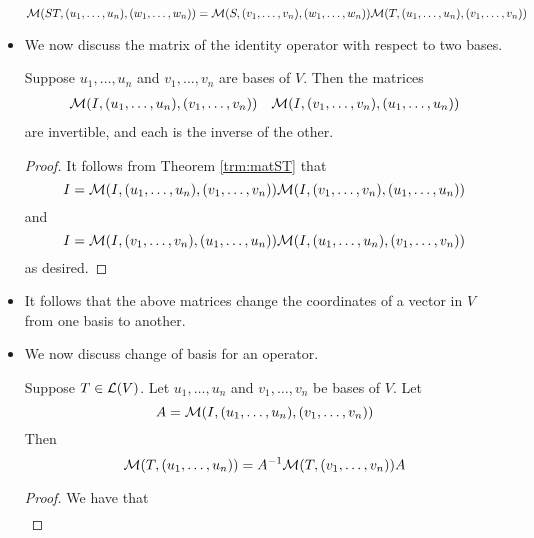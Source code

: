 \documentclass[../main.tex]{subfiles}
\begin{document}
\begin{itemize}
\begin{theorem}
        \begin{equation*}
            \mathcal{M}(ST,(u_1,\dots,u_n),(w_1,\dots,w_n)) = \mathcal{M}(S,(v_1,\dots,v_n),(w_1,\dots,w_n))\mathcal{M}(T,(u_1,\dots,u_n),(v_1,\dots,v_n))
        \end{equation*}
    \end{theorem}
    \item We now discuss the matrix of the identity operator with respect to two bases.
    \begin{theorem}\label{trm:changeBasisIdentity}
        Suppose $u_1,\dots,u_n$ and $v_1,\dots,v_n$ are bases of $V$. Then the matrices
        \begin{align*}
            \mathcal{M}(I,(u_1,\dots,u_n),(v_1,\dots,v_n))&&
            \mathcal{M}(I,(v_1,\dots,v_n),(u_1,\dots,u_n))
        \end{align*}
        are invertible, and each is the inverse of the other.
        \begin{proof}
            It follows from Theorem \ref{trm:matST} that
            \begin{equation*}
                I = \mathcal{M}(I,(u_1,\dots,u_n),(v_1,\dots,v_n))\mathcal{M}(I,(v_1,\dots,v_n),(u_1,\dots,u_n))
            \end{equation*}
            and 
            \begin{equation*}
                I = \mathcal{M}(I,(v_1,\dots,v_n),(u_1,\dots,u_n))\mathcal{M}(I,(u_1,\dots,u_n),(v_1,\dots,v_n))
            \end{equation*}
            as desired.
        \end{proof}
    \end{theorem}
    \item It follows that the above matrices change the coordinates of a vector in $V$ from one basis to another.
    \item We now discuss change of basis for an operator.
    \begin{theorem}\label{trm:similarity}
        Suppose $T\in\mathcal{L}(V)$. Let $u_1,\dots,u_n$ and $v_1,\dots,v_n$ be bases of $V$. Let
        \begin{equation*}
            A = \mathcal{M}(I,(u_1,\dots,u_n),(v_1,\dots,v_n))
        \end{equation*}
        Then
        \begin{equation*}
            \mathcal{M}(T,(u_1,\dots,u_n)) = A^{-1}\mathcal{M}(T,(v_1,\dots,v_n))A
        \end{equation*}
        \begin{proof}
            We have that
            \begin{align*}

\end{align*}
\end{proof}
\end{theorem}
\end{itemize}
\end{document}
